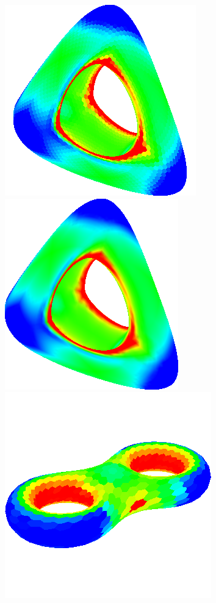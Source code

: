 \begin{figure}[!h]
    \centering
    \centering
    \includegraphics[scale=0.7]{images/gc-genus.png}
    \endminipage\hfill
    \centering
    \includegraphics[scale=0.7]{images/gci-genus.png}
    \endminipage\hfill
    \centering
    \includegraphics[scale=0.75]{images/gc-eight.png}

\end{figure}
